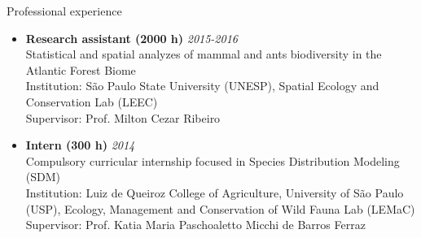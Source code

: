 \documentclass{resume}
\begin{document}

\begin{rSection}{Professional experience}
\begin{itemize}
\item {\bf Research assistant (2000 h)} \hfill{\em 2015-2016} 
\\ Statistical and spatial analyzes of mammal and ants biodiversity in the Atlantic Forest Biome
\\ Institution: São Paulo State University (UNESP), Spatial Ecology and Conservation Lab (LEEC)
\\ Supervisor: Prof. Milton Cezar Ribeiro

\item {\bf Intern (300 h)} \hfill{\em 2014} 
\\ Compulsory curricular internship focused in Species Distribution Modeling (SDM)
\\ Institution: Luiz de Queiroz College of Agriculture, University of São Paulo (USP), Ecology, Management and Conservation of Wild Fauna Lab (LEMaC)
\\ Supervisor: Prof. Katia Maria Paschoaletto Micchi de Barros Ferraz
\end{itemize}
\end{rSection}

\end{document}
